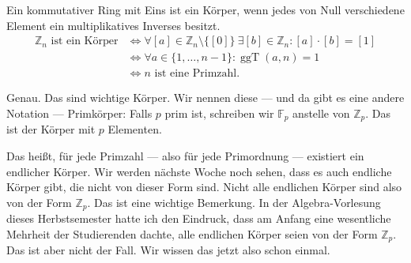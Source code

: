 \begin{math-stroke}

\begin{short-proof}
Ein kommutativer Ring mit Eins ist ein Körper, wenn jedes von Null verschiedene Element ein multiplikatives Inverses besitzt.
\begin{align*}
    \mathbb{Z}_n \text{ ist ein Körper} &\iff \forall [a] \in \mathbb{Z}_n \setminus \{[0]\} \ \exists [b] \in \mathbb{Z}_n \colon [a] \cdot [b] = [1] \\
    &\iff \forall a \in \{1, \dots, n-1\} \colon \operatorname{ggT}(a, n) = 1 \\
    &\iff n \text{ ist eine Primzahl.}
\end{align*}
\end{short-proof}
\end{math-stroke}

\begin{spoken-clean}[00:32:41 - 00:34:43]
Genau. Das sind wichtige Körper. Wir nennen diese --- und da gibt es eine andere Notation --- Primkörper: Falls $p$ prim ist, schreiben wir $\mathbb{F}_p$ anstelle von $\mathbb{Z}_p$. Das ist der Körper mit $p$ Elementen.

Das heißt, für jede Primzahl --- also für jede Primordnung --- existiert ein endlicher Körper. Wir werden nächste Woche noch sehen, dass es auch endliche Körper gibt, die nicht von dieser Form sind. Nicht alle endlichen Körper sind also von der Form $\mathbb{Z}_p$. Das ist eine wichtige Bemerkung. In der Algebra-Vorlesung dieses Herbstsemester hatte ich den Eindruck, dass am Anfang eine wesentliche Mehrheit der Studierenden dachte, alle endlichen Körper seien von der Form $\mathbb{Z}_p$. Das ist aber nicht der Fall. Wir wissen das jetzt also schon einmal.
\end{spoken-clean}

\begin{math-stroke}
\end{math-stroke}

